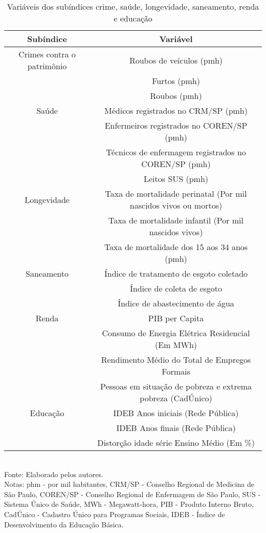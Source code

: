 


\begin{table}[H]
\caption{Variáveis dos subíndices crime, saúde, longevidade, saneamento, renda e educação}
	\begin{minipage}{1.05\linewidth}	
\begin{tabular}{cc}
\toprule
Subíndice & Variável  \\
\midrule        
Crimes contra o patrimônio & Roubos de veículos (pmh) \\
                          & Furtos  (pmh)             \\
                          & Roubos  (pmh)             \\

Saúde & Médicos registrados no CRM/SP (pmh)   \\
      & Enfermeiros registrados no COREN/SP  (pmh) \\
      & Técnicos de enfermagem registrados no COREN/SP (pmh) \\
	  & Leitos SUS (pmh)		 \\		

Longevidade & Taxa de mortalidade perinatal (Por mil nascidos vivos ou mortos) \\
			& Taxa de mortalidade infantil  (Por mil nascidos vivos)  \\	
			& Taxa de mortalidade dos 15 aos 34 anos (pmh) \\

Saneamento &  Índice de tratamento de esgoto coletado \\
		   &  Índice de coleta de esgoto  \\
		   &  Índice de abastecimento de água \\
		   
Renda      & PIB per Capita  \\
		   & Consumo de Energia Elétrica  Residencial (Em MWh) \\
		   & Rendimento Médio do Total de Empregos Formais \\
		   & Pessoas em situação de pobreza e extrema pobreza (CadÚnico) \\

Educação   & IDEB  Anos iniciais  (Rede Pública) \\
		   & IDEB  Anos finais  (Rede Pública) \\
		   & Distorção idade série  Ensino Médio (Em \%) \\

\bottomrule

\end{tabular}
\footnotesize \\
    Fonte: Elaborado pelos autores. \\
    Notas: phm - por mil habitantes, CRM/SP - Conselho Regional de Medicina de São Paulo, COREN/SP - Conselho Regional de Enfermagem de São Paulo, SUS - Sistema Único de Saúde, MWh - Megawatt-hora, PIB - Produto Interno Bruto, CadÚnico - Cadastro Único para Programas Sociais, IDEB - Índice de Desenvolvimento da Educação Básica. 
	\end{minipage}
\end{table}

